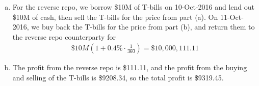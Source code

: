 \documentclass{article}
\begin{document}
\begin{enumerate}
\begin{enumerate}[(a)]
			\item 
				\begin{soln}
					For the reverse repo, we borrow \$10M of T-bills on 10-Oct-2016 and lend out \$10M of cash, then sell the T-bills for the price from part (a). On 11-Oct-2016, we buy back the T-bills for the price from part (b), and return them to the reverse repo counterparty for 
					\begin{align*}
						\$10M\left( 1+0.4\%\cdot \frac{1}{360} \right) = \$10, 000, 111.11
					\end{align*}
				\end{soln}

			\item 
				\begin{soln}
					The profit from the reverse repo is \$111.11, and the profit from the buying and selling of the T-bills is \$9208.34, so the total profit is \$9319.45.
				\end{soln}
				
		\end{enumerate}

\end{enumerate}
\end{document}
